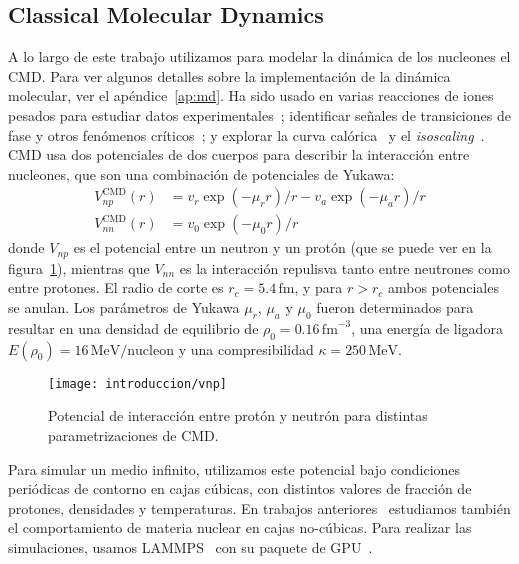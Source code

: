 \subsection{Classical Molecular Dynamics}\label{ssc:cmd}
A lo largo de este trabajo utilizamos para modelar la dinámica de los nucleones el CMD.\@
Para ver algunos detalles sobre la implementación de la dinámica molecular, ver el apéndice~\ref{ap:md}.
Ha sido usado en varias reacciones de iones pesados para estudiar datos experimentales~\cite{chernomoretz_quasiclassical_2002}; identificar señales de transiciones de fase y otros fenómenos críticos~\cite{lopez_lectures_2000, barranon_searching_2001, dorso_selection_2001, barranon_critical_2003, barranon_time_2007}; y explorar la curva calórica~\cite{barranon_entropy_2004} y el \emph{isoscaling}~\cite{dorso_dynamical_2006, dorso_isoscaling_2011}.
CMD usa dos potenciales de dos cuerpos para describir la interacción entre nucleones, que son una combinación de potenciales de Yukawa:
\begin{align*}
  V^{\text{CMD}}_{np}(r) &=v_{r}\exp(-\mu_{r}r)/{r}-v_{a}\exp(-\mu_{a}r)/{r}\\
  V^{\text{CMD}}_{nn}(r) &=v_{0}\exp(-\mu_{0}r)/{r}
\end{align*}
donde $V_{np}$ es el potencial entre un neutron y un protón (que se puede ver en la figura~\ref{fig:vnp}), mientras que $V_{nn}$ es la interacción repulisva tanto entre neutrones como entre protones.
El radio de corte es $r_c=5.4\,\text{fm}$, y para $r>r_c$ ambos potenciales se anulan.
Los parámetros de Yukawa $\mu_r$, $\mu_a$ y $\mu_0$ fueron determinados para resultar en una densidad de equilibrio de $\rho_0=0.16\,\text{fm}^{-3}$, una energía de ligadora $E(\rho_0)=16\,\text{MeV/nucleon}$ y una compresibilidad $\kappa=250\,\text{MeV}$.

\begin{figure}[h]
  \centering
  \texttt{[image: introduccion/vnp]}
  \caption{Potencial de interacción entre protón y neutrón para distintas parametrizaciones de CMD.}
\label{fig:vnp}
\end{figure}

Para simular un medio infinito, utilizamos este potencial bajo condiciones periódicas de contorno en cajas cúbicas, con distintos valores de fracción de protones, densidades y temperaturas.
En trabajos anteriores~\cite{gimenez_molinelli_finite_2015} estudiamos también el comportamiento de materia nuclear en cajas no-cúbicas.
Para realizar las simulaciones, usamos LAMMPS~\cite{plimpton_fast_1995} con su paquete de GPU~\cite{brown_implementing_2012}.

